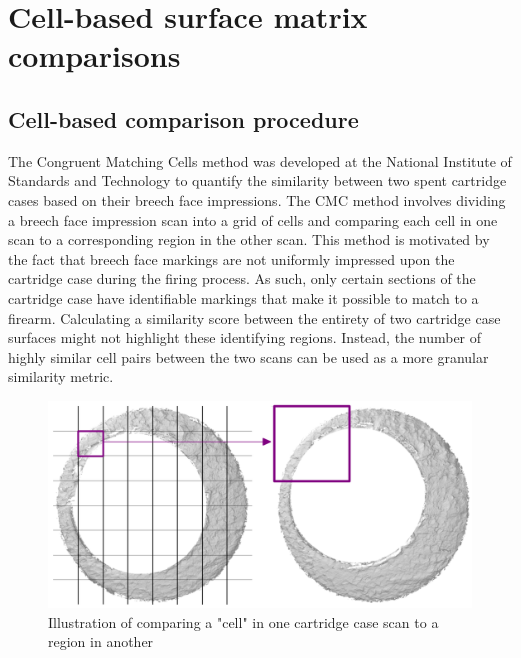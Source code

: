 \hypertarget{cell-based-surface-matrix-comparisons}{%
\section{Cell-based surface matrix
comparisons}\label{cell-based-surface-matrix-comparisons}}

\hypertarget{comparisonProcedure}{%
\subsection{Cell-based comparison procedure}\label{comparisonProcedure}}

The Congruent Matching Cells method was developed at the National
Institute of Standards and Technology to quantify the similarity between
two spent cartridge cases based on their breech face impressions. The
CMC method involves dividing a breech face impression scan into a grid
of cells and comparing each cell in one scan to a corresponding region
in the other scan. This method is motivated by the fact that breech face
markings are not uniformly impressed upon the cartridge case during the
firing process. As such, only certain sections of the cartridge case
have identifiable markings that make it possible to match to a firearm.
Calculating a similarity score between the entirety of two cartridge
case surfaces might not highlight these identifying regions. Instead,
the number of highly similar cell pairs between the two scans can be
used as a more granular similarity metric.

\begin{Schunk}
\begin{figure}[htbp]

{\centering \includegraphics[width=\textwidth]{../images/cmc_illustration} 

}

\caption{\label{fig:cmc_illustration} Illustration of comparing a "cell" in one cartridge case scan to a region in another}\label{fig:unnamed-chunk-1}
\end{figure}
\end{Schunk}

